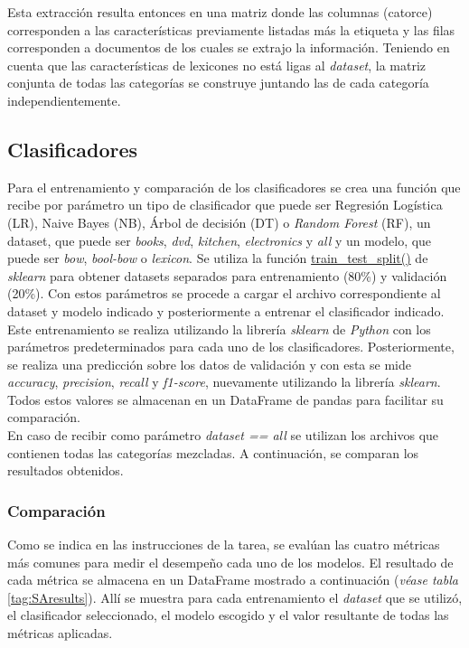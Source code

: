 Esta extracción resulta entonces en una matriz donde las columnas (catorce) corresponden a las características previamente listadas más la etiqueta y las filas corresponden a documentos de los cuales se extrajo la información. Teniendo en cuenta que las características de lexicones no está ligas al \textit{dataset}, la matriz conjunta de todas las categorías se construye juntando las de cada categoría independientemente.

\subsection{Clasificadores}
Para el entrenamiento y comparación de los clasificadores se crea una función que recibe por parámetro un tipo de clasificador que puede ser Regresión Logística (LR), Naive Bayes (NB), Árbol de decisión (DT) o \textit{Random Forest} (RF), un dataset, que puede ser \textit{books}, \textit{dvd}, \textit{kitchen}, \textit{electronics} y \textit{all} y un modelo, que puede ser \textit{bow}, \textit{bool-bow} o \textit{lexicon}. Se utiliza la función \url{train\_test\_split()} de \textit{sklearn}  para obtener datasets separados para entrenamiento (80\%) y validación (20\%). Con estos parámetros se procede a cargar el archivo correspondiente al dataset y modelo indicado y posteriormente a entrenar el clasificador indicado.\\

Este entrenamiento se realiza utilizando la librería \textit{sklearn} de \textit{Python} con los parámetros predeterminados para cada uno de los clasificadores. Posteriormente, se realiza una predicción sobre los datos de validación y con esta se mide \textit{accuracy}, \textit{precision}, \textit{recall} y \textit{f1-score}, nuevamente utilizando la librería \textit{sklearn}. Todos estos valores se almacenan en un DataFrame de pandas para facilitar su comparación.\\

En caso de recibir como parámetro \textit{dataset == all} se utilizan los archivos que contienen todas las categorías mezcladas. A continuación, se comparan los resultados obtenidos.

\subsubsection{Comparación}
Como se indica en las instrucciones de la tarea, se evalúan las cuatro métricas más comunes para medir el desempeño cada uno de los modelos. El resultado de cada métrica se almacena en un DataFrame mostrado a continuación (\textit{véase tabla} \ref{tag:SAresults}). Allí se muestra para cada entrenamiento el \textit{dataset} que se utilizó, el clasificador seleccionado, el modelo escogido y el valor resultante de todas las métricas aplicadas.


